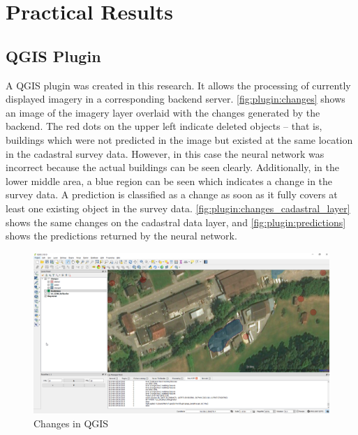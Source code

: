 
\chapter{Practical Results}\label{chp:practical_results}

\section{QGIS Plugin}
A QGIS plugin was created in this research. It allows the processing of currently displayed imagery in a corresponding backend server. \autoref{fig:plugin:changes} shows an image of the imagery layer overlaid with the changes generated by the backend. The red dots on the upper left indicate deleted objects – that is, buildings which were not predicted in the image but existed at the same location in the cadastral survey data. However, in this case the neural network was incorrect because the actual buildings can be seen clearly. Additionally, in the lower middle area, a blue region can be seen which indicates a change in the survey data. A prediction is classified as a change as soon as it fully covers at least one existing object in the survey data. \autoref{fig:plugin:changes_cadastral_layer} shows the same changes on the cadastral data layer, and \autoref{fig:plugin:predictions} shows the predictions returned by the neural network.

\begin{figure}[H]
    \centering
	\includegraphics[width=1\linewidth]{chapters/practical_results/images/qgis_changes_aerial.png}
	\caption{Changes in QGIS}
	\label{fig:plugin:changes}
\end{figure}

